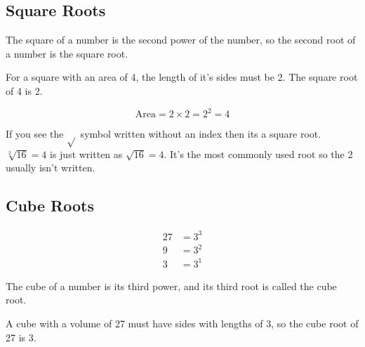 \documentclass{article}
\begin{document}
\begin{spacing}{1.25}
\pagebreak

\subsection*{Square Roots}

The square of a number is the second power of the number, so the second root of a number is the square root.

For a square with an area of 4, the length of it’s sides must be 2. The square root of 4 is 2.

\begin{figure}
  \centering
  \quad
  \begin{minipage}{5cm}
    \[
    \text{Area} = 2 \times 2 = 2^2 = 4
    \]
  \end{minipage}
\end{figure}

If you see the $\sqrt{}$ symbol written without an index then its a square root.  $\sqrt[2]{16} = 4$ is just written as $\sqrt{16} = 4.$ It’s the most commonly used root so the 2 usually isn’t written.

\subsection*{Cube Roots}
\begin{align*}
27 &= 3^3\\
9 &= 3^2\\
3 &= 3^1
\end{align*}

The cube of a number is its third power, and its third root is called the cube root.

A cube with a volume of 27 must have sides with lengths of 3, so the cube root of 27 is 3.


\end{spacing}
\end{document}
